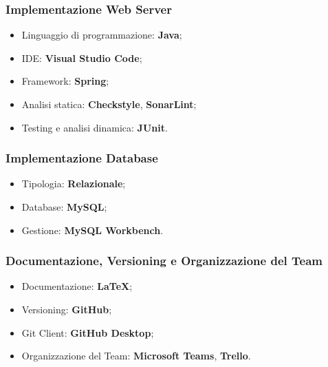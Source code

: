 \subsubsection*{Implementazione Web Server}
\begin{itemize}
    \item Linguaggio di programmazione: \textbf{Java};
    \item IDE: \textbf{Visual Studio Code};
    \item Framework: \textbf{Spring};
    \item Analisi statica: \textbf{Checkstyle}, \textbf{SonarLint};
    \item Testing e analisi dinamica: \textbf{JUnit}.
\end{itemize}

\subsubsection*{Implementazione Database}
\begin{itemize}
    \item Tipologia: \textbf{Relazionale};
    \item Database: \textbf{MySQL};
    \item Gestione: \textbf{MySQL Workbench}.
\end{itemize}

\subsubsection*{Documentazione, Versioning e Organizzazione del Team}
\begin{itemize}
    \item Documentazione: \textbf{LaTeX};
    \item Versioning: \textbf{GitHub};
    \item Git Client: \textbf{GitHub Desktop};
    \item Organizzazione del Team: \textbf{Microsoft Teams}, \textbf{Trello}.
\end{itemize}
    